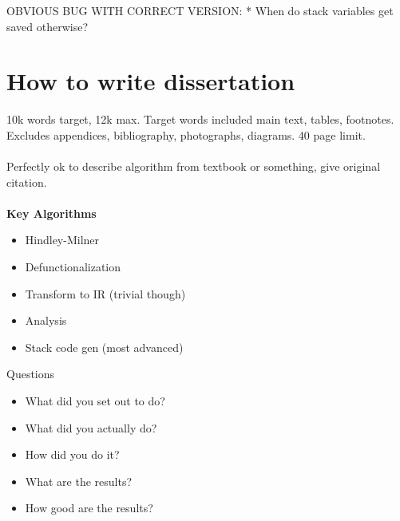 \documentclass{report}
\begin{document}
OBVIOUS BUG WITH CORRECT VERSION:
* When do stack variables get saved otherwise?

\section*{How to write dissertation}
10k words target, 12k max. Target words included main text, tables, footnotes. Excludes appendices, bibliography, photographs, diagrams.
40 page limit.
\\\\
Perfectly ok to describe algorithm from textbook or something, give original citation.
\\\\
\textbf{Key Algorithms}
\begin{itemize}
	\item Hindley-Milner
	\item Defunctionalization
	\item Transform to IR (trivial though)
	\item Analysis
	\item Stack code gen (most advanced)
\end{itemize}

Questions
\begin{itemize}
	\item What did you set out to do?
	\item What did you actually do?
	\item How did you do it?
	\item What are the results?
	\item How good are the results?	
\end{itemize}
\end{document}
